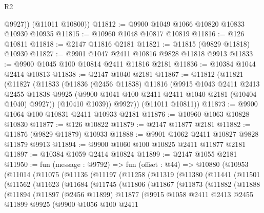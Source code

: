 \begin{lexlean}{R2}
\begin{coremodule}
          @9927))
      (@11011 @10800))
@11812 := @9900 @1049 @1066 @10820 @10833 @10930 @10935
@11815 := @10960 @1048 @10817 @10819
@11816 := @126 @10811
@11818 := @2147 @11816 @2181
@11821 := @11815 (@9829 @11818) @10930
@11827 := @9901 @1047 @2411 @10816 @9828 @11818 @9913
@11833 := @9900 @1045 @100 @10814 @2411 @11816 @2181
@11836 := @10384 @1044 @2414 @10813
@11838 := @2147 @1040 @2181
@11867 := @11812
    (@11821
      (@11827
        (@11833
          (@11836
            (@2456 @11838)
            @11816
            (@9915
              @1043
              @2411
              @2413
              @2455
              @11838
              @9925
              (@9900 @1041 @100 @2411 @2411 @1040 @2181 (@10404 @1040) @9927))
            (@10410 @1039))
          @9927))
      (@11011 @10811))
@11873 := @9900 @1064 @100 @10831 @2411 @10933 @2181
@11876 := @10960 @1063 @10828 @10830
@11877 := @126 @10822
@11879 := @2147 @11877 @2181
@11882 := @11876 (@9829 @11879) @10933
@11888 := @9901 @1062 @2411 @10827 @9828 @11879 @9913
@11894 := @9900 @1060 @100 @10825 @2411 @11877 @2181
@11897 := @10384 @1059 @2414 @10824
@11899 := @2147 @1055 @2181
@11950 := fun (message : @9792) =>
  fun (offset : @44) =>
  @10880
    (@10953
      (@11014
        (@11075
          (@11136
            (@11197
              (@11258
                (@11319
                  (@11380
                    (@11441
                      (@11501
                        (@11562
                          (@11623
                            (@11684
                              (@11745
                                (@11806
                                  (@11867
                                    (@11873
                                      (@11882
                                        (@11888
                                          (@11894
                                            (@11897
                                              (@2456 @11899)
                                              @11877
                                              (@9915
                                                @1058
                                                @2411
                                                @2413
                                                @2455
                                                @11899
                                                @9925
                                                (@9900
                                                  @1056
                                                  @100
                                                  @2411

\end{coremodule}
\end{lexlean}
